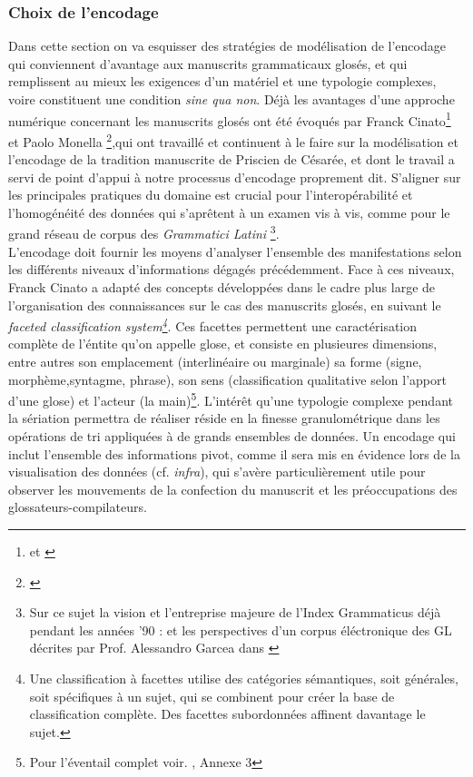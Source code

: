 \documentclass[a4paper, twoside, 12pt]{book}
\begin{document}
\subsubsection{Choix de l'encodage}

Dans cette section on va esquisser des stratégies de modélisation de l'encodage qui conviennent d'avantage aux manuscrits grammaticaux glosés, et qui remplissent au mieux les exigences d’un matériel et une typologie complexes, voire constituent une condition \textit{sine qua non}. Déjà les avantages d'une approche numérique concernant les manuscrits glosés ont été évoqués par Franck Cinato\footnote{\cite{cinato2015priscien} et \cite{cinato2011perspectives}} et Paolo Monella \footnote{\cite{monella2019digital}},qui ont travaillé et continuent à le faire sur la modélisation et l'encodage de la tradition manuscrite de Priscien de Césarée, et dont le travail a servi de point d'appui à notre processus d'encodage proprement dit. S'aligner sur les principales pratiques du domaine est crucial pour l'interopérabilité et l'homogénéité des données qui s'aprêtent à un examen vis à vis, comme pour le grand réseau de corpus des \textit{Grammatici Latini} \footnote{ Sur ce sujet la vision et l'entreprise majeure de l'Index Grammaticus déjà pendant les années '90 : \cite{lomanto1990index} et les perspectives d'un corpus éléctronique des GL décrites par Prof. Alessandro Garcea dans \cite{garcea2010corpus}}.\\

L'encodage doit fournir les moyens d’analyser l’ensemble des manifestations selon les différents niveaux d’informations dégagés précédemment. Face à ces niveaux, Franck Cinato a adapté des concepts développées dans le cadre plus large de l’organisation des connaissances sur le cas des manuscrits glosés, en suivant le \textit{faceted classification system\footnote{Une classification à facettes utilise des catégories sémantiques, soit générales, soit spécifiques à un sujet, qui se combinent pour créer la base de classification complète. Des facettes subordonnées affinent davantage le sujet.}}. Ces facettes permettent une caractérisation complète de l'éntite qu'on appelle glose, et consiste en plusieures dimensions, entre autres son emplacement (interlinéaire ou marginale) sa forme (signe, morphème,syntagme, phrase), son sens (classification qualitative selon l'apport d'une glose) et l'acteur (la main)\footnote{Pour l'éventail complet voir. \cite{cinato2015priscien}, Annexe 3}. L’intérêt qu’une  typologie complexe pendant la sériation permettra de réaliser réside en la  \og{}finesse granulométrique\fg{} dans les opérations de tri appliquées à de grands ensembles de données. Un encodage qui inclut l'ensemble des informations pivot, comme il sera mis en évidence lors de la visualisation des données (cf. \textit{infra}), qui s'avère particulièrement utile pour observer les mouvements de la confection du manuscrit et les préoccupations des glossateurs-compilateurs.\\
\end{document}
